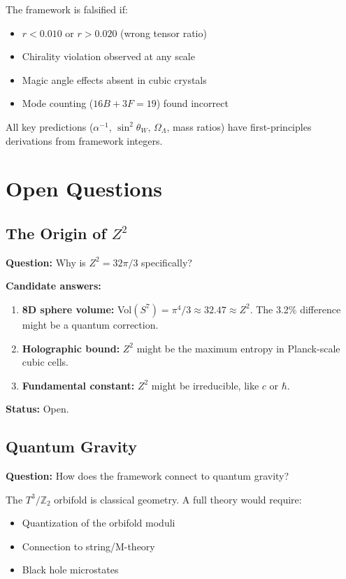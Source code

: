 \documentclass[12pt,a4paper]{article}
\newcommand{\Ztwo}{\mathbb{Z}_2}
\newcommand{\Tthree}{T^3}
\newcommand{\OmegaL}{\Omega_\Lambda}
\newcommand{\sinW}{\sin^2\theta_W}
\newcommand{\Zsq}{Z^2}
\begin{document}
The framework is falsified if:
\begin{itemize}
    \item $r < 0.010$ or $r > 0.020$ (wrong tensor ratio)
    \item Chirality violation observed at any scale
    \item Magic angle effects absent in cubic crystals
    \item Mode counting ($16B + 3F = 19$) found incorrect
\end{itemize}

All key predictions ($\alpha^{-1}$, $\sinW$, $\OmegaL$, mass ratios) have first-principles derivations from framework integers.

\section{Open Questions}
\label{sec:open}

\subsection{The Origin of $\Zsq$}

\textbf{Question:} Why is $\Zsq = 32\pi/3$ specifically?

\textbf{Candidate answers:}
\begin{enumerate}
    \item \textbf{8D sphere volume:} Vol$(S^7) = \pi^4/3 \approx 32.47 \approx \Zsq$. The 3.2\% difference might be a quantum correction.
    \item \textbf{Holographic bound:} $\Zsq$ might be the maximum entropy in Planck-scale cubic cells.
    \item \textbf{Fundamental constant:} $\Zsq$ might be irreducible, like $c$ or $\hbar$.
\end{enumerate}

\textbf{Status:} Open.

\subsection{Quantum Gravity}

\textbf{Question:} How does the framework connect to quantum gravity?

The $\Tthree/\Ztwo$ orbifold is classical geometry. A full theory would require:
\begin{itemize}
    \item Quantization of the orbifold moduli
    \item Connection to string/M-theory
    \item Black hole microstates
\end{itemize}
\end{document}
